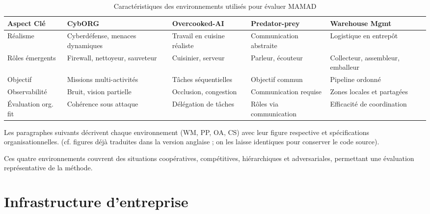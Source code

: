 \begin{table}[h!]
    \centering
    \begin{footnotesize}
        \renewcommand{\arraystretch}{1.3}
        \begin{tabular}{p{2cm}p{2.2cm}p{2.2cm}p{2.2cm}p{2.2cm}}
            \hline
            \textbf{Aspect Clé} & \textbf{CybORG}                & \textbf{Overcooked-AI} & \textbf{Predator-prey} & \textbf{Warehouse Mgmt} \\ \hline
            Réalisme            & Cyberdéfense, menaces dynamiques & Travail en cuisine réaliste & Communication abstraite & Logistique en entrepôt \\ \hline
            Rôles émergents     & Firewall, nettoyeur, sauveteur & Cuisinier, serveur      & Parleur, écouteur       & Collecteur, assembleur, emballeur \\ \hline
            Objectif            & Missions multi-activités        & Tâches séquentielles    & Objectif commun         & Pipeline ordonné \\ \hline
            Observabilité       & Bruit, vision partielle         & Occlusion, congestion   & Communication requise   & Zones locales et partagées \\ \hline
            Évaluation org. fit & Cohérence sous attaque          & Délégation de tâches    & Rôles via communication & Efficacité de coordination \\ \hline
        \end{tabular}
        \caption{Caractéristiques des environnements utilisés pour évaluer MAMAD}
        \label{tab:mamad_env_characteristics}
    \end{footnotesize}
\end{table}

Les paragraphes suivants décrivent chaque environnement (WM, PP, OA, CS) avec leur figure respective et spécifications organisationnelles. (cf. figures déjà traduites dans la version anglaise ; on les laisse identiques pour conserver le code source).

\bigskip

\noindent Ces quatre environnements couvrent des situations coopératives, compétitives, hiérarchiques et adversariales, permettant une évaluation représentative de la méthode.


\section{Infrastructure d'entreprise}

